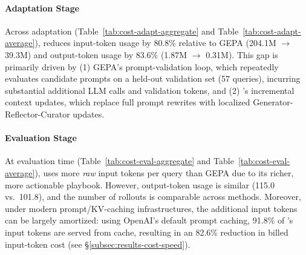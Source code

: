 \paragraph{Adaptation Stage}
Across adaptation (Table~\ref{tab:cost-adapt-aggregate} and Table~\ref{tab:cost-adapt-average}), \name reduces input-token usage by 80.8\% relative to GEPA (204.1M $\rightarrow$ 39.3M) and output-token usage by 83.6\% (1.87M $\rightarrow$ 0.31M).
This gap is primarily driven by (1) GEPA's prompt-validation loop, which repeatedly evaluates candidate prompts on a held-out validation set (57 queries), incurring substantial additional LLM calls and validation tokens, and (2) \name's incremental context updates, which replace full prompt rewrites with localized Generator-Reflector-Curator updates.

\paragraph{Evaluation Stage}
At evaluation time (Table~\ref{tab:cost-eval-aggregate} and Table~\ref{tab:cost-eval-average}), \name uses more \emph{raw} input tokens per query than GEPA due to its richer, more actionable playbook.
However, output-token usage is similar (115.0 vs.~101.8), and the number of rollouts is comparable across methods.
Moreover, under modern prompt/KV-caching infrastructures, the additional input tokens can be largely amortized: using OpenAI's default prompt caching, 91.8\% of \name's input tokens are served from cache, resulting in an 82.6\% reduction in billed input-token cost (see \S\ref{subsec:results-cost-speed}).

